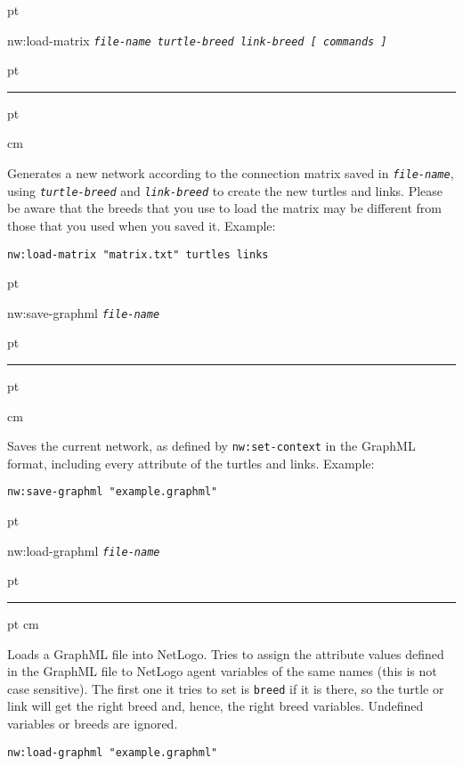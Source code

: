 \documentclass[10pt]{article}
\newenvironment{prim}{
  \vskip 6 pt
  \ttfamily
  \bfseries
}{
  \vskip 2 pt
  \hrule
  \vskip 6 pt
}
\newenvironment{doc}{
  \leftskip 0.5 cm
}
{}
\newcommand{\param}[1]{\texttt{\textit{\textmd{#1}}}}
\begin{document}
\begin{prim}
nw:load-matrix \param{file-name turtle-breed link-breed [ commands ]}
\end{prim}

\begin{doc}
Generates a new network according to the connection matrix saved in
\param{file-name}, using \param{turtle-breed} and \param{link-breed} to create
the new turtles and links. Please be aware that the breeds that you use to load
the matrix may be different from those that you used when you saved it. Example:

\begin{Verbatim}
nw:load-matrix "matrix.txt" turtles links
\end{Verbatim}
\end{doc}

\begin{prim}
nw:save-graphml \param{file-name}
\end{prim}

\begin{doc}
Saves the current network, as defined by \texttt{nw:set-context} in the GraphML format,
including every attribute of the turtles and links. Example:
\begin{Verbatim}
nw:save-graphml "example.graphml"
\end{Verbatim}
\end{doc}

\begin{prim}
nw:load-graphml \param{file-name}
\end{prim}
\begin{doc}

Loads a GraphML file into NetLogo. Tries to assign the attribute values
defined in the GraphML file to NetLogo agent variables of the same names (this
is not case sensitive). The first one it tries to set is \texttt{breed} if it is
there, so the turtle or link will get the right breed and, hence, the right
breed variables. Undefined variables or breeds are ignored.
\begin{Verbatim}
nw:load-graphml "example.graphml"
\end{Verbatim}
\end{doc}
\end{document}
